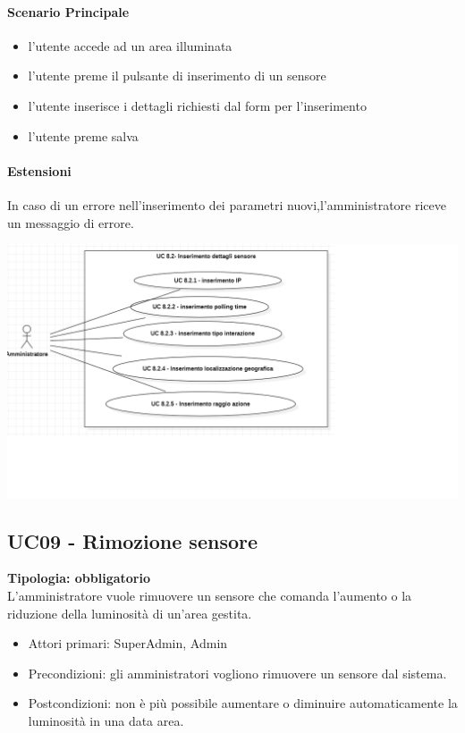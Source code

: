 \documentclass[12pt]{article}
\begin{document}
\paragraph{Scenario Principale}
\begin{itemize}
	\item l'utente accede ad un area illuminata
	\item l'utente preme il pulsante di inserimento di un sensore
	\item l'utente inserisce i dettagli richiesti dal form per l'inserimento
	\item l'utente preme salva
\end{itemize}
\paragraph{Estensioni} In caso di un errore nell'inserimento dei parametri nuovi,l'amministratore riceve un messaggio di errore.

\includegraphics[scale=0.5]{UC08.png}

\subsection{UC09 - Rimozione sensore}
\textbf{Tipologia: obbligatorio}\\
L'amministratore vuole rimuovere un sensore che comanda l'aumento o la riduzione della luminosità di un'area gestita.
\begin{itemize}
	\item Attori primari: SuperAdmin, Admin
	\item Precondizioni: gli amministratori vogliono rimuovere un sensore dal sistema.
	\item Postcondizioni: non è più possibile aumentare o diminuire automaticamente la luminosità in una data area.
\end{itemize}
\end{document}
